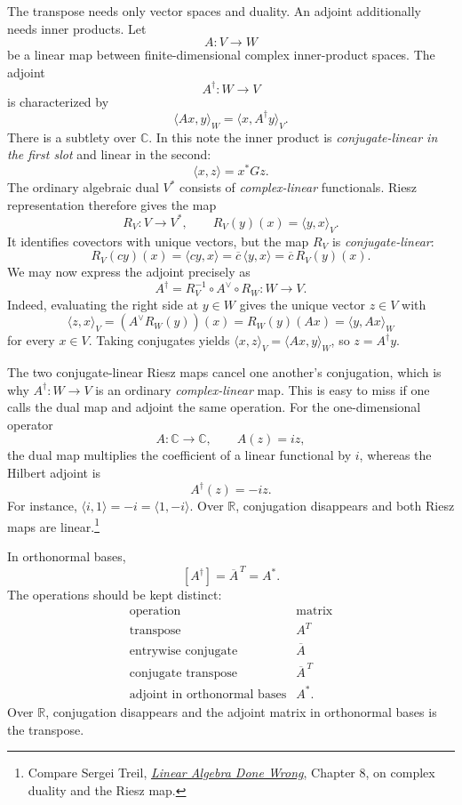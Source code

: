 The transpose needs only vector spaces and duality.  An adjoint additionally needs inner products.  Let
\[
  A:V\to W
\]
be a linear map between finite-dimensional complex inner-product spaces.  The adjoint
\[
  A^\dagger:W\to V
\]
is characterized by
\[
  \langle Ax,y\rangle_W
  =\langle x,A^\dagger y\rangle_V.
\]
There is a subtlety over $\mathbb C$. In this note the inner product is \emph{conjugate-linear in the first slot} and linear in the second:
\[
 \langle x,z\rangle=x^*Gz.
\]
The ordinary algebraic dual $V^*$ consists of \emph{complex-linear} functionals. Riesz representation therefore gives the map
\[
 R_V:V\longrightarrow V^*,
 \qquad R_V(y)(x)=\langle y,x\rangle_V.
\]
It identifies covectors with unique vectors, but the map $R_V$ is \emph{conjugate-linear}:
\[
 R_V(cy)(x)=\langle cy,x\rangle
 =\overline c\,\langle y,x\rangle
 =\overline c\,R_V(y)(x).
\]
We may now express the adjoint precisely as
\[
 \boxed{A^\dagger=R_V^{-1}\circ A^\vee\circ R_W:
 W\longrightarrow V.}
\]
Indeed, evaluating the right side at $y\in W$ gives the unique vector $z\in V$ with
\[
 \langle z,x\rangle_V
 =(A^\vee R_W(y))(x)
 =R_W(y)(Ax)
 =\langle y,Ax\rangle_W
\]
for every $x\in V$. Taking conjugates yields
$\langle x,z\rangle_V=\langle Ax,y\rangle_W$,
so $z=A^\dagger y$.

The two conjugate-linear Riesz maps cancel one another's conjugation, which is why $A^\dagger:W\to V$ is an ordinary \emph{complex-linear} map. This is easy to miss if one calls the dual map and adjoint the same operation. For the one-dimensional operator
\[
 A:\mathbb C\to\mathbb C,\qquad A(z)=iz,
\]
the dual map multiplies the coefficient of a linear functional by $i$, whereas the Hilbert adjoint is
\[
 \boxed{A^\dagger(z)=-iz.}
\]
For instance, $\langle i,1\rangle=-i=\langle1,-i\rangle$. Over $\mathbb R$, conjugation disappears and both Riesz maps are linear.\footnote{Compare Sergei Treil, \href{https://www.math.brown.edu/streil/papers/LADW/HTML_2026_08-31/Ch8.html}{\emph{Linear Algebra Done Wrong}}, Chapter 8, on complex duality and the Riesz map.}

In orthonormal bases,
\[
  [A^\dagger]=\overline A^{\,T}=A^*.
\]
The operations should be kept distinct:
\[
\begin{array}{c|c}
\text{operation}&\text{matrix}\\ \hline
\text{transpose}&A^T\\
\text{entrywise conjugate}&\overline A\\
\text{conjugate transpose}&\overline A^{\,T}\\
\text{adjoint in orthonormal bases}&A^*.
\end{array}
\]
Over \(\mathbb R\), conjugation disappears and the adjoint matrix in orthonormal bases is the transpose.

